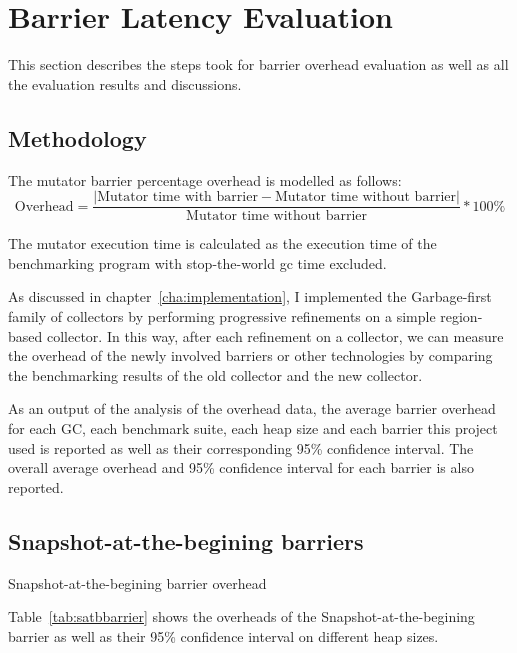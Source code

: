 \section{Barrier Latency Evaluation} %
\label{sec:barrierlatency}

This section describes the steps took for barrier overhead evaluation as well as
all the evaluation results and discussions.

\subsection{Methodology}

The mutator barrier percentage overhead is modelled as follows:
$$
\text{Overhead} = \frac{|\text{Mutator time with barrier} - \text{Mutator time without barrier}|}{\text{Mutator time without barrier}} * 100\%
$$

The mutator execution time is calculated as the execution time of the benchmarking program with
stop-the-world gc time excluded.

As discussed in chapter~\ref{cha:implementation}, I implemented the Garbage-first
family of collectors by performing progressive refinements on a simple region-based collector.
In this way, after each refinement on a collector, we can measure the overhead of
the newly involved barriers or other technologies by comparing the benchmarking results
of the old collector and the new collector.

As an output of the analysis of the overhead data, the average barrier overhead
for each GC, each benchmark suite, each heap size and each barrier this project used is reported
as well as their corresponding 95\% confidence interval.
The overall average overhead and 95\% confidence interval for each barrier is also reported.

\subsection{Snapshot-at-the-begining barriers}

\begin{table*}
  \centering
  
  \caption{Snapshot-at-the-begining barrier overhead}
  \label{tab:satbbarrier}
\end{table*}

Table~\ref{tab:satbbarrier} shows the overheads of the Snapshot-at-the-begining barrier
as well as their 95\% confidence interval on different heap sizes.

